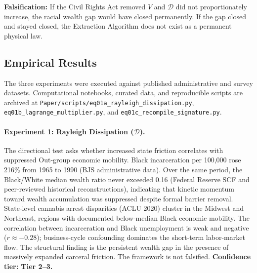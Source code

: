 \textbf{Falsification:} If the Civil Rights Act removed $V$ and $\mathcal{D}$ did not proportionately increase, the racial wealth gap would have closed permanently. If the gap closed and stayed closed, the Extraction Algorithm does not exist as a permanent physical law.

\subsection{Empirical Results}

The three experiments were executed against published administrative and survey datasets. Computational notebooks, curated data, and reproducible scripts are archived at \texttt{Paper/scripts/eq01a\_rayleigh\_dissipation.py}, \texttt{eq01b\_lagrange\_multiplier.py}, and \texttt{eq01c\_recompile\_signature.py}.

\paragraph{Experiment 1: Rayleigh Dissipation ($\mathcal{D}$).}
The directional test asks whether increased state friction correlates with suppressed Out-group economic mobility. Black incarceration per 100,000 rose 216\% from 1965 to 1990 (BJS administrative data). Over the same period, the Black/White median wealth ratio never exceeded 0.16 (Federal Reserve SCF and peer-reviewed historical reconstructions), indicating that kinetic momentum toward wealth accumulation was suppressed despite formal barrier removal. State-level cannabis arrest disparities (ACLU 2020) cluster in the Midwest and Northeast, regions with documented below-median Black economic mobility. The correlation between incarceration and Black unemployment is weak and negative ($r \approx -0.28$); business-cycle confounding dominates the short-term labor-market flow. The structural finding is the persistent wealth gap in the presence of massively expanded carceral friction. The framework is not falsified. \textbf{Confidence tier: Tier 2--3.}

